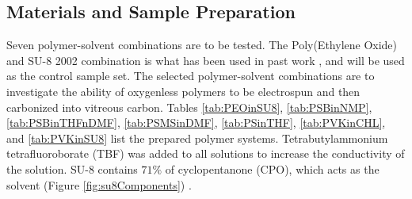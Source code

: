 
\subsection{Materials and Sample Preparation}

Seven polymer-solvent combinations are to be tested. The Poly(Ethylene Oxide) and SU-8 2002 combination is what has been used in past work \cite{Cardenas2017, Flores2017}, and will be used as the control sample set. The selected polymer-solvent combinations are to investigate the ability of oxygenless polymers to be electrospun and then carbonized into vitreous carbon. Tables \ref{tab:PEOinSU8}, \ref{tab:PSBinNMP}, \ref{tab:PSBinTHFnDMF}, \ref{tab:PSMSinDMF}, \ref{tab:PSinTHF}, \ref{tab:PVKinCHL}, and \ref{tab:PVKinSU8} list the prepared polymer systems. Tetrabutylammonium tetrafluoroborate (TBF) was added to all solutions to increase the conductivity of the solution. SU-8 contains $71\%$ of cyclopentanone (CPO), which acts as the solvent (Figure \ref{fig:su8Components}) \cite{Microchem2012}.

